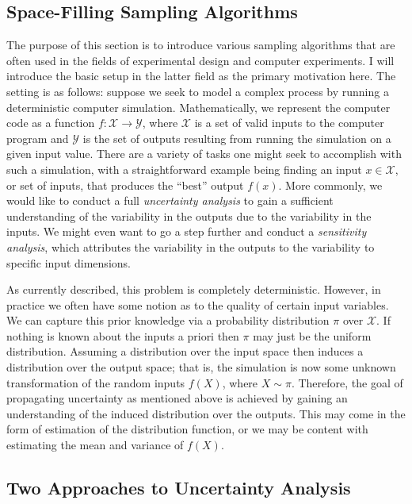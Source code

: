 \documentclass[12pt]{article}
\begin{document}
\subsection{Space-Filling Sampling Algorithms}
The purpose of this section is to introduce various sampling algorithms that are often used in the fields of experimental design and computer experiments. I will introduce the 
basic setup in the latter field as the primary motivation here. The setting is as follows: suppose we seek to model a complex process by running a deterministic computer simulation. 
Mathematically, we represent the computer code as a function $f: \mathcal{X} \to \mathcal{Y}$, where $\mathcal{X}$ is a set of valid inputs to the computer program and 
$\mathcal{Y}$ is the set of outputs resulting from running the simulation on a given input value. There are a variety of tasks one might seek to accomplish with such a simulation, with a 
straightforward example being finding an input $x \in \mathcal{X}$, or set of inputs, that produces the ``best'' output $f(x)$. More commonly, we would like to conduct a full \textit{uncertainty analysis}
to gain a sufficient understanding of the variability in the outputs due to the variability in the inputs. We might even want to go a step further and conduct a \textit{sensitivity analysis}, which 
attributes the variability in the outputs to the variability to specific input dimensions. 

As currently described, this problem is completely deterministic. However, in practice we often have some notion as to the quality of certain input variables. We can capture this prior knowledge via a probability distribution $\pi$ over $\mathcal{X}$. If nothing is known about the inputs a priori then $\pi$ may just be the uniform distribution. Assuming a distribution over the input space then induces a distribution over the output space; that is, the simulation is now some unknown transformation of the random inputs $f(X)$, where $X \sim \pi$. Therefore, the
goal of propagating uncertainty as mentioned above is achieved by gaining an understanding of the induced distribution over the outputs. This may come in the form of estimation of the 
distribution function, or we may be content with estimating the mean and variance of $f(X)$.  

\subsection{Two Approaches to Uncertainty Analysis}
\end{document}
